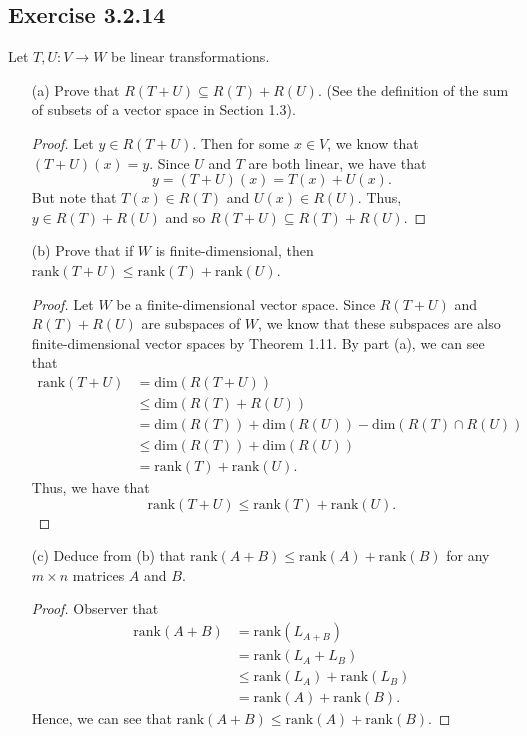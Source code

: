 \subsection*{Exercise 3.2.14} Let \( T, U : V \to W  \) be linear transformations.
\begin{enumerate}
    \item[(a)] Prove that \( R(T+U) \subseteq R(T) + R(U)  \). (See the definition of the sum of subsets of a vector space in Section 1.3).
        \begin{proof}
        Let \( y \in R(T+U)  \). Then for some \( x \in V  \), we know that \( (T+U)(x) = y  \). Since \( U  \) and \( T  \) are both linear, we have that
        \[  y = (T+U)(x) = T(x) + U(x). \]
        But note that \( T(x) \in R(T)  \) and \( U(x) \in R(U)  \). Thus, \( y \in R(T) + R(U) \) and so \( R(T+U) \subseteq R(T) + R(U) \).
        \end{proof}
    \item[(b)] Prove that if \( W  \) is finite-dimensional, then \( \text{rank}(T+U) \leq \text{rank}(T) + \text{rank}(U) \).
        \begin{proof}
        Let \( W  \) be a finite-dimensional vector space. Since \( R(T+U)  \) and \( R(T) + R(U)  \) are subspaces of \( W  \), we know that these subspaces are also finite-dimensional vector spaces by Theorem 1.11. By part (a), we can see that
        \begin{align*}
            \text{rank}(T+U)  &= \text{dim}(R(T+U))  \\
                              &\leq \text{dim}(R(T) + R(U)) \\
                              &= \text{dim}(R(T)) + \text{dim}(R(U)) - \text{dim}(R(T) \cap R(U)) \\
                              &\leq \text{dim}(R(T)) + \text{dim}(R(U)) \\
                              &= \text{rank}(T) + \text{rank}(U).
        \end{align*}
        Thus, we have that
        \[  \text{rank}(T+U) \leq \text{rank}(T) + \text{rank}(U). \]
        \end{proof}
    \item[(c)] Deduce from (b) that \( \text{rank}(A+B) \leq \text{rank}(A) + \text{rank}(B) \) for any \( m \times n  \) matrices \( A  \) and \( B  \).
        \begin{proof}
        Observer that
        \begin{align*}
            \text{rank}(A+B)   &= \text{rank}({L}_{A+B}) \\
                               &= \text{rank}({L}_{A} + {L}_{B}) \tag{part (c) of Theorem 2.15} \\
                               &\leq \text{rank}({L}_{A}) + \text{rank}({L}_{B}) \tag{part (b)} \\
                               &= \text{rank}(A) + \text{rank}(B).
        \end{align*}
        Hence, we can see that \( \text{rank}(A+B) \leq \text{rank}(A) + \text{rank}(B) \).
        \end{proof}
\end{enumerate}

